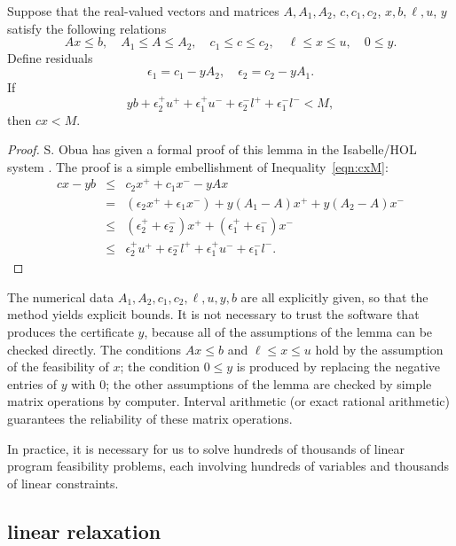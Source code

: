 \begin{lemma}  Suppose that the real-valued vectors and matrices
$A,A_1,A_2$, $c,c_1,c_2$, $x,b,\ell,u$, $y$ satisfy the following
relations
  $$
  A x\le b, \quad A_1 \le A \le A_2,
  \quad c_1 \le c \le c_2,\quad \ell\le x\le u,\quad
  0\le y.
  $$
Define residuals
  $$
   \epsilon_1 = c_1 - y A_2,\quad \epsilon_2 = c_2  - y A_1.
  $$
If
$$
y b + \epsilon_2^+ u^+ + \epsilon_1^+ u^- + \epsilon_2^- l^+ + \epsilon_1^- l^- < M,
$$
then $c x < M$.
\end{lemma}

\begin{proof} S. Obua has given a formal proof of this lemma in the
Isabelle/HOL system \cite[3.7.2]{Obua:2008:Thesis}.  The proof
is a simple embellishment of Inequality~\ref{eqn:cxM}:
\begin{eqnarray*}
c x -y b &\le& c_2 x^+ + c_1 x^- -y A x\\
              &=& (\epsilon_2 x^+ + \epsilon_1 x^-)
  + y (A_1-A) x^+ + y (A_2 - A) x^- \\
              &\le& (\epsilon_2^+ +\epsilon_2^-) x^+ 
       + (\epsilon_1^++\epsilon_1^-) x^-\\
              &\le& \epsilon_2^+ u^+ +  \epsilon_2^- l^+ 
           + \epsilon_1^+ u^- + \epsilon_1^- l^-.
\end{eqnarray*}
\end{proof}

The numerical data $A_1,A_2,c_1,c_2,\ell,u,y,b$ are all explicitly given,
so that the method yields explicit bounds.
It is not necessary to trust the software
that produces the certificate $y$, because
all of the assumptions of the lemma can be checked directly.
The conditions $A x \le b$ and $\ell\le x\le u$ hold by the assumption
of the feasibility of $x$; the condition $0\le y$ is produced by replacing the
negative entries of $y$ with $0$; the other assumptions of the lemma are
checked by simple matrix operations by computer.  Interval arithmetic 
(or exact rational arithmetic) guarantees
the reliability of these matrix
operations.

In practice, it is necessary for us to solve hundreds of thousands of
linear program feasibility problems, each involving
hundreds of variables and thousands of linear constraints.

\subsection{linear relaxation}


